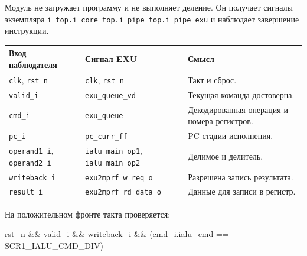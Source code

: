 \documentclass[
  russian,
]{article}
\newenvironment{Shaded}{}{}
\newcommand{\NormalTok}[1]{#1}
\newcounter{none} %
\begin{document}
Модуль не загружает программу и не выполняет деление. Он получает
сигналы экземпляра
\texttt{i\_top.i\_core\_top.i\_pipe\_top.i\_pipe\_exu} и наблюдает
завершение инструкции.

{\def\LTcaptype{none} %
\begin{longtable}[]{@{}
  >{\raggedright\arraybackslash}p{}
  >{\raggedright\arraybackslash}p{}
  >{\raggedright\arraybackslash}p{}@{}}
\toprule\noalign{}
\begin{minipage}[b]{\linewidth}\raggedright
Вход наблюдателя
\end{minipage} & \begin{minipage}[b]{\linewidth}\raggedright
Сигнал EXU
\end{minipage} & \begin{minipage}[b]{\linewidth}\raggedright
Смысл
\end{minipage} \\
\midrule\noalign{}
\endhead
\bottomrule\noalign{}
\endlastfoot
\texttt{clk}, \texttt{rst\_n} & \texttt{clk}, \texttt{rst\_n} & Такт и
сброс. \\
\texttt{valid\_i} & \texttt{exu\_queue\_vd} & Текущая команда
достоверна. \\
\texttt{cmd\_i} & \texttt{exu\_queue} & Декодированная операция и номера
регистров. \\
\texttt{pc\_i} & \texttt{pc\_curr\_ff} & PC стадии исполнения. \\
\texttt{operand1\_i}, \texttt{operand2\_i} & \texttt{ialu\_main\_op1},
\texttt{ialu\_main\_op2} & Делимое и делитель. \\
\texttt{writeback\_i} & \texttt{exu2mprf\_w\_req\_o} & Разрешена запись
результата. \\
\texttt{result\_i} & \texttt{exu2mprf\_rd\_data\_o} & Данные для записи
в регистр. \\
\end{longtable}
}

На положительном фронте такта проверяется:

\begin{Shaded}
\begin{Highlighting}[]
\NormalTok{rst\_n \&\& valid\_i \&\& writeback\_i}
\NormalTok{    \&\& (cmd\_i.ialu\_cmd == SCR1\_IALU\_CMD\_DIV)}
\end{Highlighting}
\end{Shaded}
\end{document}

